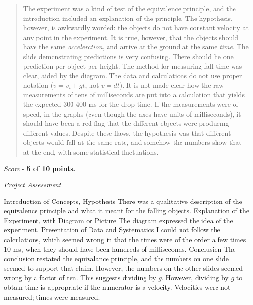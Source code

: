 \documentclass[10pt]{article}
\begin{document}
\maketitle

\begin{abstract}
The experiment was a kind of test of the equivalence principle, and the introduction included an explanation of the principle.  The hypothesis, however, is awkwardly worded: the objects do not have constant velocity at any point in the experiment.  It is true, however, that the objects should have the same \textit{acceleration}, and arrive at the ground at the same \textit{time}.  The slide demonstrating predictions is very confusing.  There should be one prediction per object per height.  The method for measuring fall time was clear, aided by the diagram.  The data and calculations do not use proper notation ($v = v_i + gt$, not $v = d t$).  It is not made clear how the raw measurements of tens of milliseconds are put into a calculation that yields the expected 300-400 ms for the drop time.  If the measurements were of speed, in the graphs (even though the axes have units of milliseconds), it should have been a red flag that the different objects were producing different values.  Despite these flaws, the hypothesis was that different objects would fall at the same rate, and somehow the numbers show that at the end, with some statistical fluctuations.
\end{abstract}

\textit{Score} - \textbf{5 of 10 points.}

\textit{Project Assessment}
\begin{outline}[enumerate]
\1 Introduction of Concepts, Hypothesis
\2 There was a qualitative description of the equivalence principle and what it meant for the falling objects.
\1 Explanation of the Experiment, with Diagram or Picture
\2 The diagram expressed the idea of the experiment.
\1 Presentation of Data and Systematics
\2 I could not follow the calculations, which seemed wrong in that the times were of the order a few times $10$ ms, when they should have been hundreds of milliseconds.
\1 Conclusion
\2 The conclusion restated the equivalance principle, and the numbers on one slide seemed to support that claim.  However, the numbers on the other slides seemed wrong by a factor of ten.  This suggests dividing by $g$.  However, dividing by $g$ to obtain time is appropriate if the numerator is a velocity.  Velocities were not measured; times were measured.
\end{outline}
\end{document}
